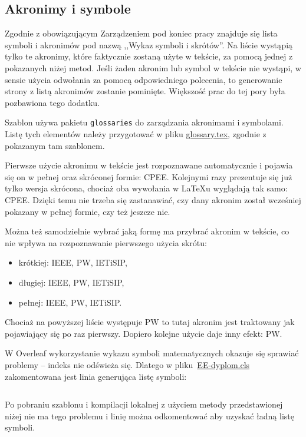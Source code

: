 \subsection{Akronimy i symbole}
Zgodnie z obowiązującym Zarządzeniem pod koniec pracy znajduje się lista symboli i akronimów pod nazwą ,,Wykaz symboli i skrótów''. Na liście wystąpią tylko te akronimy, które faktycznie zostaną użyte w tekście, za pomocą jednej z pokazanych niżej metod. Jeśli żaden akronim lub symbol w tekście nie wystąpi, w sensie użycia odwołania za pomocą odpowiedniego polecenia, to generowanie strony z listą akronimów zostanie pominięte. Większość prac do tej pory była pozbawiona tego dodatku.

Szablon używa pakietu \texttt{glossaries} do zarządzania akronimami i symbolami. Listę tych elementów należy przygotować w pliku \href{./glossary.tex}{glossary.tex}, zgodnie z pokazanym tam szablonem.

Pierwsze użycie akronimu w tekście jest rozpoznawane automatycznie i pojawia się on w pełnej oraz skróconej formie: \gls{CPEE}. Kolejnymi razy prezentuje się już tylko wersja skrócona, chociaż oba wywołania w \LaTeX{u} wyglądają tak samo: \gls{CPEE}. Dzięki temu nie trzeba się zastanawiać, czy dany akronim został wcześniej pokazany w pełnej formie, czy też jeszcze nie.

Można też samodzielnie wybrać jaką formę ma przybrać akronim w tekście, co nie wpływa na rozpoznawanie pierwszego użycia skrótu:
\begin{itemize}
	\item krótkiej: \acrshort{IEEE}, \acrshort{PW}, \acrshort{IETiSIP},
	\item długiej: \acrlong{IEEE}, \acrlong{PW}, \acrlong{IETiSIP},
	\item pełnej: \acrfull{IEEE}, \acrfull{PW}, \acrfull{IETiSIP}.
\end{itemize}

Chociaż na powyższej liście występuje \gls{PW} to tutaj akronim jest traktowany jak pojawiający się po raz pierwszy. Dopiero kolejne użycie daje inny efekt: \gls{PW}.

W Overleaf wykorzystanie wykazu symboli matematycznych okazuje się sprawiać problemy -- indeks nie odświeża się. Dlatego w pliku~\href{./EE-dyplom.cls}{EE-dyplom.cls} zakomentowana jest linia generująca listę symboli:
\begin{lstlisting}[language=TeX,
    firstnumber=666,
    caption=EE-dyplom.cls,
    label={lst:EE-dyplom}]
%    \printglossary[type=symbols,title={}] % problem z symbolami
\end{lstlisting}
Po pobraniu szablonu i kompilacji lokalnej z użyciem metody przedstawionej niżej nie ma tego problemu i linię można odkomentować aby uzyskać ładną listę symboli.


